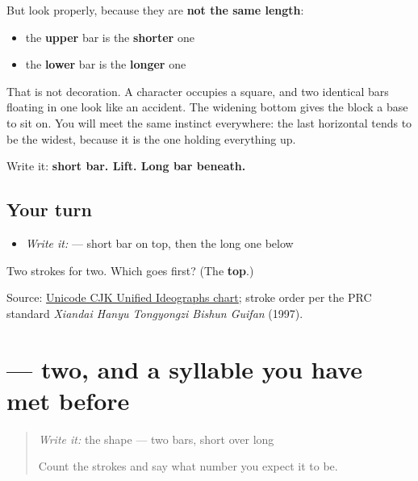 But look properly, because they are \textbf{not the same length}:

\begin{itemize}
\raggedright
  \item the \textbf{upper} bar is the \textbf{shorter} one
  \item the \textbf{lower} bar is the \textbf{longer} one
\end{itemize}

That is not decoration. A character occupies a square, and two identical bars floating in one look like an accident. The widening bottom gives the block a base to sit on. You will meet the same instinct everywhere: the last horizontal tends to be the widest, because it is the one holding everything up.

Write it: \textbf{short bar. Lift. Long bar beneath.}

\subsection*{Your turn}
\begin{itemize}
\raggedright
  \item \emph{Write it:}  — short bar on top, then the long one below
\end{itemize}

\begin{tcolorbox}[breakable,colback=teal!4,colframe=teal!35!black,title={Before you move on}]
Two strokes for two. Which goes first? (The \textbf{top}.)

Source: \href{https://www.unicode.org/charts/PDF/U4E00.pdf}{Unicode CJK Unified Ideographs chart}; stroke order per the PRC standard \emph{Xiandai Hanyu Tongyongzi Bishun Guifan} (1997).
\end{tcolorbox}
\section[\texorpdfstring{\zh{二} (èr)}{二 (èr)}]{ — two, and a syllable you have met before}

\label{lesson:ZH-C03-er}



\begin{quote}
\emph{Write it:} the shape — two bars, short over long

Count the strokes and say what number you expect it to be.
\end{quote}

